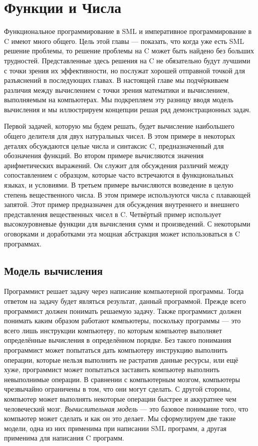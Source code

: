 \chapter{Функции и Числа}\label{chapterFunctionsAndNumbers}

Функциональное программирование в SML и императивное программирование в C имеют много общего. Цель этой главы --- показать, что когда уже есть SML решение проблемы, то решение проблемы на C может быть найдено без больших трудностей. Представленные здесь решения на C не обязательно будут лучшими с точки зрения их эффективности, но послужат хорошей отправной точкой для разъяснений в последующих главах. В настоящей главе мы подчёркиваем различия между вычислением с точки зрения математики и вычислением, выполняемым на компьютерах. Мы подкрепляем эту разницу вводя модель вычисления и мы иллюстрируем концепции решая ряд демонстрационных задач.

Первой задачей, которую мы будем решать, будет вычисление наибольшего общего делителя для двух натуральных чисел. В этом примере в некоторых деталях обсуждаются целые числа и синтаксис C, предназначенный для обозначения функций. Во втором примере вычисляются значения арифметических выражений. Он служит для обсуждения различий между сопоставлением с образцом, которые часто встречаются в функциональных языках, и условиями. В третьем примере вычисляются возведение в целую степень вещественного числа. В этом примере используются числа с плавающей запятой. Этот пример предназначен для обсуждения внутреннего и внешнего представления вещественных чисел в C. Четвёртый пример использует высокоуровневые функции для вычисления сумм и произведений. С некоторыми оговорками и доработками эта мощная абстракция может использоваться в C программах.

\section{Модель вычисления}\label{sectionModelOfComputation}

Программист решает задачу через написание компьютерной программы. Тогда ответом на задачу будет являться результат, данный программой. Прежде всего программист должен понимать решаемую задачу. Также программист должен понимать каким образом работают компьютеры, поскольку программы --- это всего лишь инструкции компьютеру, по которым компьютер выполняет определённые вычисления в определённом порядке. Без такого понимания программист может попытаться дать компьютеру инструкцию выполнить операции, которые нельзя выполнить не растратив данные ресурсы, или ещё хуже, программист может попытаться заставить компьютер выполнить невыполнимые операции. В сравнении с компьютерным мозгом, компьютеры чрезвычайно ограничены в том, что они могут сделать. С другой стороны, компьютер может выполнять некоторые операции быстрее и аккуратнее чем человеческий мозг. \emph{Вычислительная модель} --- это базовое понимание того, что компьютер может сделать и как он это делает. Мы сформулируем две такие модели, одна из них применима при написании SML программ, а другая применима для написания C программ.

